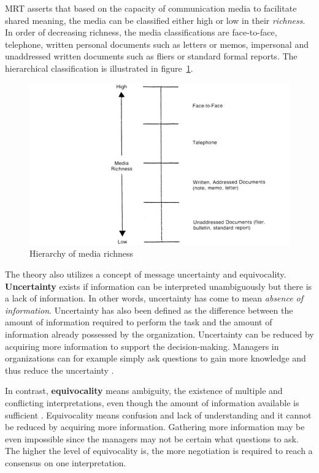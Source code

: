 \documentclass[english,12pt,a4paper,pdftex]{article}
\begin{document}
\ac{MRT} asserts that based on the capacity of communication media to facilitate shared meaning, the media can be classified either high or low in their \emph{richness}. In order of decreasing richness, the media classifications are face-to-face, telephone, written personal documents such as letters or memos, impersonal and unaddressed written documents such as fliers or standard formal reports. The hierarchical classification is illustrated in figure~\ref{fig:hierarchy_of_media_richness}.

\begin{figure}[htb]
\begin{center}
\includegraphics[width=1.0\textwidth]{hierarchy_of_media_richness.png}
\end{center}
\caption{Hierarchy of media richness \citep{daft1987}}
\label{fig:hierarchy_of_media_richness}
\end{figure}

The theory also utilizes a concept of message uncertainty and equivocality. \textbf{Uncertainty} exists if information can be interpreted unambiguously but there is a lack of information. In other words, uncertainty has come to mean \textit{absence of information}. Uncertainty has also been defined as the difference between the amount of information required to perform the task and the amount of information already possessed by the organization. Uncertainty can be reduced by acquiring more information to support the decision-making. Managers in organizations can for example simply ask questions to gain more knowledge and thus reduce the uncertainty \citep{daft1987}.

In contrast, \textbf{equivocality} means ambiguity, the existence of multiple and conflicting interpretations, even though the amount of information available is sufficient \citep{daft1987}. Equivocality means confusion and lack of understanding and it cannot be reduced by acquiring more information. Gathering more information may be even impossible since the managers may not be certain what questions to ask. The higher the level of equivocality is, the more negotiation is required to reach a consensus on one interpretation.
\end{document}
